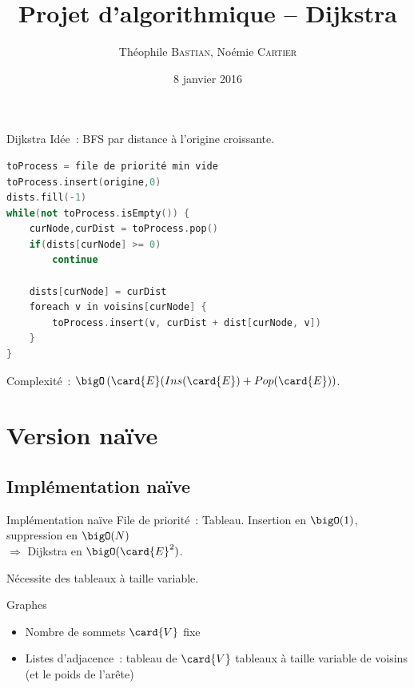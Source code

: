 \documentclass[11pt]{beamer}
\author{Théophile \textsc{Bastian}, Noémie \textsc{Cartier}}
\title{Projet d'algorithmique -- Dijkstra}
\date{8 janvier 2016}
\begin{document}
\begin{frame}
\titlepage
\end{frame}

\begin{frame}
\tableofcontents
\end{frame}

\begin{frame}[fragile]{Dijkstra}
\alert{Idée~:} BFS par distance à l'origine croissante.

\vspace{1em}
\begin{lstlisting}[language=C++]
toProcess = file de priorité min vide
toProcess.insert(origine,0)
dists.fill(-1)
while(not toProcess.isEmpty()) {
	curNode,curDist = toProcess.pop()
	if(dists[curNode] >= 0)
		continue

	dists[curNode] = curDist
	foreach v in voisins[curNode] {
		toProcess.insert(v, curDist + dist[curNode, v])
	}
}
\end{lstlisting}

\alert{Complexité~:} $\bigO\left(\card{E} (Ins(\card{E}) + Pop(\card{E})\right)$.

\end{frame}

\section{Version naïve}

\subsection{Implémentation naïve}
\begin{frame}{Implémentation naïve}
\alert{File de priorité~:} Tableau. Insertion en $\bigO(1)$, suppression en $\bigO(N)$ \\
\qquad $\Longrightarrow$ Dijkstra en $\bigO(\card{E}^2)$.

\vspace{1em}
Nécessite des \alert{tableaux à taille variable}.

\vspace{1em}
\begin{block}{Graphes}
\begin{itemize}
\item Nombre de sommets $\card{V}$ fixe
\item Listes d'adjacence~: tableau de $\card{V}$ tableaux à taille variable de voisins (et le poids de l'arête)
\end{itemize} 
\end{block}
\end{frame}
\end{document}
